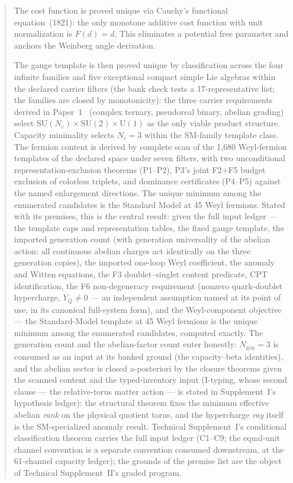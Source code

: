 \documentclass[11pt]{article}
\newcommand{\SU}{\mathrm{SU}}
\newcommand{\U}{\mathrm{U}}
\begin{document}
\begin{abstract}
The cost function is proved unique via Cauchy's functional equation~(1821): the only monotone additive cost function with unit normalization is $F(d) = d$.  This eliminates a potential free parameter and anchors the Weinberg angle derivation.

The gauge template is then proved unique by classification across the four infinite families and five exceptional compact simple Lie algebras within the declared carrier filters (the bank check tests a 17-representative list; the families are closed by monotonicity): the three carrier requirements derived in Paper~1~\cite{BrookePaper1} (complex ternary, pseudoreal binary, abelian grading) select $\SU(N_c) \times \SU(2) \times \U(1)$ as the only viable product structure.  Capacity minimality selects $N_c = 3$ within the SM-family template class.  The fermion content is derived by complete scan of the 1{,}680 Weyl-fermion templates of the declared space under seven filters, with two unconditional representation-exclusion theorems (P1--P2), P3's joint F2$+$F5 budget exclusion of colorless triplets, and dominance certificates (P4--P5) against the named enlargement directions.  The unique minimum among the enumerated candidates is the Standard Model at 45 Weyl fermions.  Stated with its premises, this is the central result: given the full input ledger --- the template caps and representation tables, the fixed gauge template, the imported generation count (with generation universality of the abelian action: all continuous abelian charges act identically on the three generation copies), the imported one-loop Weyl coefficient, the anomaly and Witten equations, the F3 doublet--singlet content predicate, CPT identification, the F6 non-degeneracy requirement (nonzero quark-doublet hypercharge, $Y_Q \neq 0$ --- an independent assumption named at its point of use, in its canonical full-system form), and the Weyl-component objective --- the Standard-Model template at 45 Weyl fermions is the unique minimum among the enumerated candidates, computed exactly.  The generation count and the abelian-factor count enter honestly: $N_{\mathrm{gen}} = 3$ is consumed as an input at its banked ground (the capacity--beta identities), and the abelian sector is closed a-posteriori by the closure theorems given the scanned content and the typed-inventory input (I-typing, whose second clause --- the relative-torus matter action --- is stated in Supplement~I's hypothesis ledger): the structural theorem fixes the minimum effective abelian \emph{rank} on the physical quotient torus, and the hypercharge \emph{ray} itself is the SM-specialized anomaly result.  Technical Supplement~I's conditional classification theorem carries the full input ledger (C1--C9; the equal-unit channel convention is a separate convention consumed downstream, at the 61-channel capacity ledger); the grounds of the premise list are the object of Technical Supplement~II's graded program.


\end{abstract}
\end{document}
